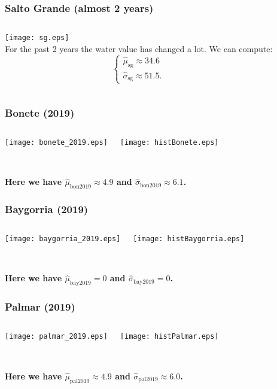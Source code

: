 \documentclass[aspectratio=169]{beamer}
\begin{document}
\begin{frame}\frametitle{Salto Grande (almost 2 years)}
\begin{columns}[c]

\texttt{[image: sg.eps]}\\

For the past 2 years the water value has changed a lot. We can compute:
\begin{equation*}
\begin{cases}
\hat{\mu}_{\text{sg}}\approx34.6\\
\hat{\sigma}_{\text{sg}}\approx51.5.
\end{cases}
\end{equation*}

\end{columns}
\end{frame}


\begin{frame}\frametitle{Bonete (2019)}
\begin{columns}[c]

\texttt{[image: bonete\_2019.eps]}

\texttt{[image: histBonete.eps]}

\end{columns}
\quad\\
\textbf{Here we have $\hat{\mu}_{\text{bon2019}}\approx4.9$ and $\hat{\sigma}_{\text{bon2019}}\approx6.1$.}

\end{frame}


\begin{frame}\frametitle{Baygorria (2019)}
\begin{columns}[c]

\texttt{[image: baygorria\_2019.eps]}

\texttt{[image: histBaygorria.eps]}

\end{columns}
\quad\\
\textbf{Here we have $\hat{\mu}_{\text{bay2019}}=0$ and $\hat{\sigma}_{\text{bay2019}}=0$.}

\end{frame}


\begin{frame}\frametitle{Palmar (2019)}
\begin{columns}[c]

\texttt{[image: palmar\_2019.eps]}

\texttt{[image: histPalmar.eps]}

\end{columns}
\quad\\
\textbf{Here we have $\hat{\mu}_{\text{pal2019}}\approx4.9$ and $\hat{\sigma}_{\text{pal2019}}\approx6.0$.}

\end{frame}
\end{document}
